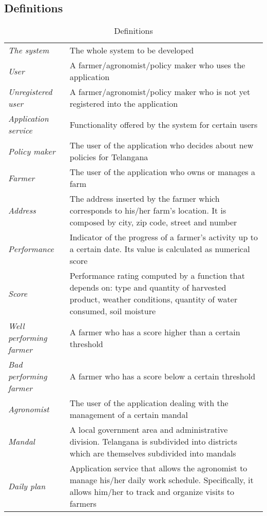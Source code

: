 \newpage
\subsection{Definitions}
\begin{center}
\setlength\tabcolsep{7pt}
\renewcommand{\arraystretch}{2}
\begin{longtable}{|m{3.2cm}|m{8.3cm}|}
\caption{Definitions}\\
\hline
\endfirsthead
\endhead
\hline
\endlastfoot
\textit{The system} & The whole system to be developed \\
\textit{User} & A farmer/agronomist/policy maker who uses the application\\
\textit{Unregistered user} & A farmer/agronomist/policy maker who is not yet registered into the application\\
\textit{Application service} & Functionality offered by the system for certain users \\
\textit{Policy maker} & The user of the application who decides about new policies for Telangana \\
\textit{Farmer} & The user of the application who owns or manages a farm\\
\textit{Address} & The address inserted by the farmer which corresponds to his/her farm's location. It is composed by city, zip code, street and number\\
\textit{Performance} & Indicator of the progress of a farmer's activity up to a certain date. Its value is calculated as numerical score \\
\textit{Score} & Performance rating computed by a function that depends on: type and quantity of harvested product, weather conditions, quantity of water consumed, soil moisture\\
\textit{Well performing farmer} & A farmer who has a score higher than a certain threshold\\
\textit{Bad performing farmer} & A farmer who has a score below a certain threshold\\
\textit{Agronomist} & The user of the application dealing with the management of a certain mandal\\
\textit{Mandal} & A local government area and  administrative division. Telangana is subdivided into districts which are themselves subdivided into mandals\\
\textit{Daily plan} & Application service that allows the agronomist to manage his/her daily work schedule. Specifically, it allows him/her to track and organize visits to farmers\\

\end{longtable}
\end{center}
